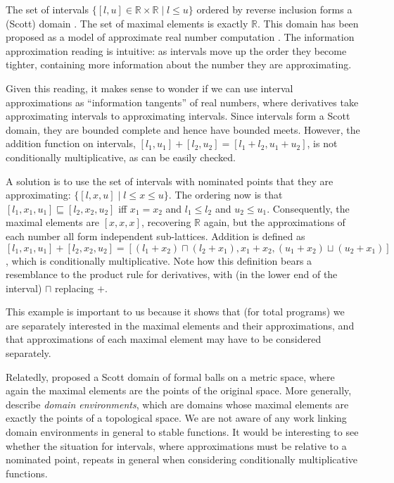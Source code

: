 \begin{example}
  \label{ex:intervals-and-maxima-elements}
  The set of intervals
  $\{ [l,u] \in \mathbb{R} \times \mathbb{R} \mid l \leq u \}$ ordered
  by reverse inclusion forms a (Scott) domain
  \cite{scott-outline}. The set of maximal elements is exactly
  $\mathbb{R}$. This domain has been proposed as a model of
  approximate real number computation \cite{escardo-real-pcf}. The
  information approximation reading is intuitive: as intervals move up
  the order they become tighter, containing more information about the
  number they are approximating.

  Given this reading, it makes sense to wonder if we can use interval
  approximations as ``information tangents'' of real numbers, where
  derivatives take approximating intervals to approximating
  intervals. Since intervals form a Scott domain, they are bounded
  complete and hence have bounded meets. However, the addition
  function on intervals, $[l_1,u_1] + [l_2,u_2] = [l_1+l_2,u_1+u_2]$,
  is not conditionally multiplicative, as can be easily checked.

  A solution is to use the set of intervals with nominated points that
  they are approximating: $\{[l,x,u] \mid l \leq x \leq u\}$. The
  ordering now is that $[l_1,x_1,u_1] \sqsubseteq [l_2,x_2,u_2]$ iff
  $x_1 = x_2$ and $l_1 \leq l_2$ and $u_2 \leq u_1$. Consequently, the
  maximal elements are $[x,x,x]$, recovering $\mathbb{R}$ again, but
  the approximations of each number all form independent sub-lattices.
  Addition is defined as
  $[l_1,x_1,u_1] + [l_2,x_2,u_2] = [(l_1+x_2) \sqcap
  (l_2+x_1),x_1+x_2,(u_1+x_2)\sqcup(u_2+x_1)]$, which is conditionally
  multiplicative. Note how this definition bears a resemblance to the
  product rule for derivatives, with (in the lower end of the
  interval) $\sqcap$ replacing $+$.

  This example is important to us because it shows that (for total
  programs) we are separately interested in the maximal elements and
  their approximations, and that approximations of each maximal
  element may have to be considered separately.

  Relatedly, \citet{edalat-heckmann98} proposed a Scott domain of
  formal balls on a metric space, where again the maximal elements are
  the points of the original space. More generally,
  \citet[Section V-6]{continuous-lattice-book} describe \emph{domain
    environments}, which are domains whose maximal elements are
  exactly the points of a topological space. We are not aware of any
  work linking domain environments in general to stable functions. It
  would be interesting to see whether the situation for intervals,
  where approximations must be relative to a nominated point, repeats
  in general when considering conditionally multiplicative functions.
\end{example}

